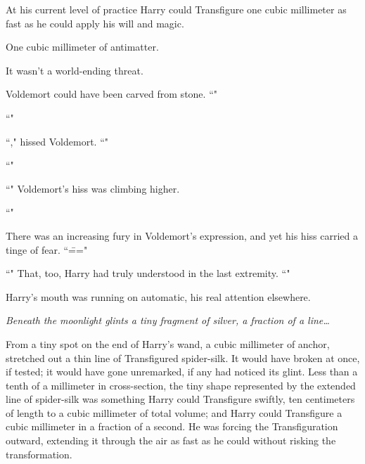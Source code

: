 At his current level of practice Harry could Transfigure one cubic millimeter as fast as he could apply his will and magic.

One cubic millimeter of antimatter.

It wasn't a world-ending threat.

Voldemort could have been carved from stone. ``"

``"

``," hissed Voldemort. ``"

``"

``" Voldemort's hiss was climbing higher.

``"

There was an increasing fury in Voldemort's expression, and yet his hiss carried a tinge of fear. ``\==="

``" That, too, Harry had truly understood in the last extremity. ``"

Harry's mouth was running on automatic, his real attention elsewhere.

\emph{Beneath the moonlight glints a tiny fragment of silver, a fraction of a line{\ldots}}

From a tiny spot on the end of Harry's wand, a cubic millimeter of anchor, stretched out a thin line of Transfigured spider-silk. It would have broken at once, if tested; it would have gone unremarked, if any had noticed its glint. Less than a tenth of a millimeter in cross-section, the tiny shape represented by the extended line of spider-silk was something Harry could Transfigure swiftly, ten centimeters of length to a cubic millimeter of total volume; and Harry could Transfigure a cubic millimeter in a fraction of a second. He was forcing the Transfiguration outward, extending it through the air as fast as he could without risking the transformation.

